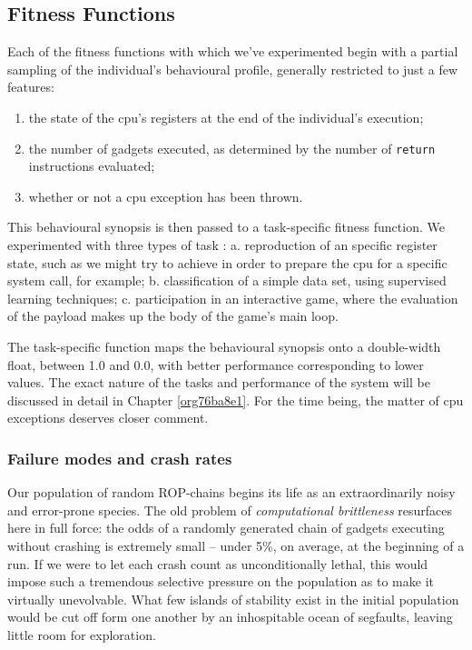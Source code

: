 \documentclass[12pt,glossary]{dalthesis}
\begin{document}
\subsection{Fitness Functions}
\label{sec:orgbe1b77e}
\label{org33607fe}

Each of the fitness functions with which we've experimented begin with a partial
sampling of the individual's behavioural profile, generally restricted to just
a few features:
\begin{enumerate}
\item the state of the \gls{cpu}'s registers at the end of the individual's execution;
\item the number of gadgets executed, as determined by the number of \texttt{return}
instructions evaluated;
\item whether or not a \gls{cpu} exception has been thrown.
\end{enumerate}

This behavioural synopsis is then passed to a task-specific fitness function. We
experimented with three types of task : 
  a. reproduction of an specific register state, such as we might try to achieve
     in order to prepare the \gls{cpu} for a specific system call, for example;
  b. classification of a simple data set, using supervised learning techniques;
  c. participation in an interactive game, where the evaluation of the payload
     makes up the body of the game's main loop.

The task-specific function maps the behavioural synopsis onto a double-width float,
between 1.0 and 0.0, with better performance corresponding to lower values. 
The exact nature of the tasks and performance of the system will be discussed in
detail in Chapter \ref{org76ba8e1}. For the time being, the matter of \gls{cpu}
exceptions deserves closer comment.

\subsubsection{Failure modes and crash rates}
\label{sec:orgb3b69f5}

Our population of random ROP-chains begins its life as an extraordinarily noisy
and error-prone species. The old problem of \emph{computational brittleness}  resurfaces here in full force: the odds of a
randomly generated chain of gadgets executing without crashing is extremely
small  -- under 5\%, on average, at the
beginning of a run.  If we were to let each crash count as unconditionally
lethal, this would impose such a tremendous selective pressure on the population
as to make it virtually unevolvable. What few islands of stability exist in the
initial population would be cut off form one another by an inhospitable ocean of
segfaults, leaving little room for exploration.
\end{document}
